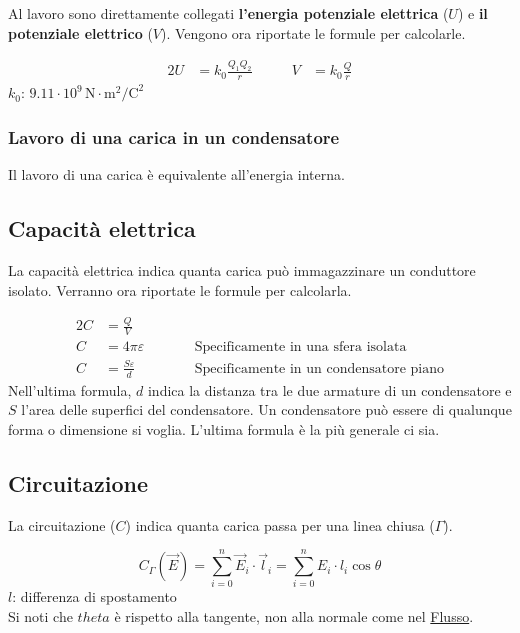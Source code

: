 Al lavoro sono direttamente collegati \textbf{l'energia potenziale elettrica} ($U$) e 
\textbf{il potenziale elettrico} ($V$). Vengono ora riportate le formule per calcolarle.

\begin{alignat*}{2}
U &= k_0\frac{Q_1Q_2}{r} &\qquad V &= k_0\frac{Q}{r}
\end{alignat*}
\hyperref[tab:k0]{$k_0$}: $9.11\cdot10^9\,\text{N}\cdot\text{m}^2\text{/C}^2$

\subsubsection{Lavoro di una carica in un condensatore}
Il lavoro di una carica è equivalente all'energia interna.

\subsection{Capacità elettrica}\label{sub:elettrostatica:capacita}
La capacità elettrica indica quanta carica può immagazzinare un conduttore isolato. Verranno ora 
riportate le formule per calcolarla.

\begin{alignat*}{2}
C &= \frac{Q}{V} &\qquad &\\
C &= 4\pi\varepsilon & &\text{Specificamente in una sfera isolata}\\
C &= \frac{S\varepsilon}{d} & &\text{Specificamente in un condensatore piano}
\end{alignat*}
Nell'ultima formula, $d$ indica la distanza tra le due armature di un condensatore e $S$ l'area 
delle superfici del condensatore. Un condensatore può essere di qualunque forma o dimensione si
voglia. L'ultima formula è la più generale ci sia.

\subsection{Circuitazione}
La circuitazione ($C$) indica quanta carica passa per una linea chiusa ($\Gamma$).

\begin{equation*}
C_\Gamma\left(\vec{E}\right) = \sum\limits_{i=0}^{n}\vec{E}_i\cdot\vec{l}_i = 
\sum\limits_{i=0}^{n} E_i\cdot l_i\cos\theta
\end{equation*}
$l$: differenza di spostamento\\
Si noti che $theta$ è rispetto alla tangente, non alla normale come nel 
\hyperref[subsec:flusso]{Flusso}.
\begin{center}
\end{center}

